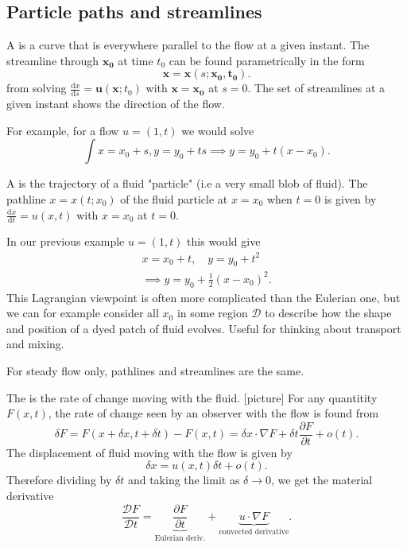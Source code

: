 \documentclass[a4paper]{scrartcl}
\begin{document}
\subsection{Particle paths and streamlines}
\begin{definition}[Streamline]
     A  is a curve that is everywhere parallel to the flow at a given instant. The streamline through $\bm{x_0 } $ at time $t_0 $ can be found parametrically in the form \[
     \bm{x} =\bm{x} (s; \bm{x_0 } , \bm{t_0 } )
     .\] from solving $\frac{\mathrm{d}x}{\mathrm{d}s}=\bm{u} (\bm{x};t_0 )$ with $\bm{x} =\bm{x_0 } $ at $s=0$. The set of streamlines at a given instant shows the direction of the flow.
\end{definition}
For example, for a flow $u= (1,t)$ we would solve \[
\int x = x_0 +s, y=y_0 +ts \implies y=y_0 +t (x-x_0 )
.\] 
\begin{definition}
     A  is the trajectory of a fluid "particle" (i.e a very small blob of fluid). The pathline $x=x (t;x_0 )$ of the fluid particle at $x=x_0 $ when $t=0$ is given by $\frac{\mathrm{d}x}{\mathrm{d}t}=u (x,t)$ with $x=x_0 $ at $t=0$.
\end{definition}
In our previous example $u= (1,t)$ this would give 
\begin{align*}
    x=x_0 +t, \quad y=y_0 +t^2 \\
    \implies y=y_0 + \frac{1}{2} (x-x_0)^2.
\end{align*}
This Lagrangian viewpoint is often more complicated than the Eulerian one, but we can for example consider all $x_0 $ in some region $\mathcal{D}$ to describe how the shape and position of a dyed patch of fluid evolves. Useful for thinking about transport and mixing.
\begin{remark}
     For steady flow only, pathlines and streamlines are the same. 
\end{remark}
\begin{definition}
     The  is the rate of change moving with the fluid. [picture] For any quantitity $F (x,t)$, the rate of change seen by an observer with the flow is found from \[
     \delta F =F (x+\delta x, t+\delta t)-F (x,t)=\delta x \cdot \nabla F +\delta t \frac{\partial F}{\partial t}+o (t)
     .\] 
     The displacement of fluid moving with the flow is given by \[
     \delta x= u (x,t) \delta t + o (t)
     .\] Therefore dividing by $\delta t$ and taking the limit as $\delta \rightarrow 0$, we get the material derivative \[
     \frac{\mathcal{D}F}{\mathcal{D}t}=\underbrace{\frac{\partial F}{\partial t}}_{\text{Eulerian deriv.} } + \underbrace{u \cdot \nabla F}_{\text{convected derivative} } 
     .\] 
\end{definition}
\end{document}
